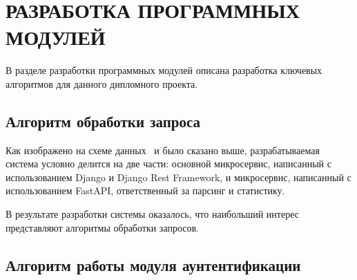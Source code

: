 \section{РАЗРАБОТКА ПРОГРАММНЫХ МОДУЛЕЙ}
\label{sec:dev}

В разделе разработки программных модулей описана разработка ключевых алгоритмов для данного дипломного проекта.



\subsection{Алгоритм обработки запроса}
Как изображено на схеме данных \dataScheme\ и было сказано выше, разрабатываемая система условно делится на две части:
основной микросервис, написанный с использованием Django и Django Rest Framework,
и микросервис, написанный с использованием FastAPI, ответственный за парсинг и статистику.

В результате разработки системы оказалось, что наибольший интерес представляют алгоритмы обработки запросов.


\subsection{Алгоритм работы модуля аунтентификации}



